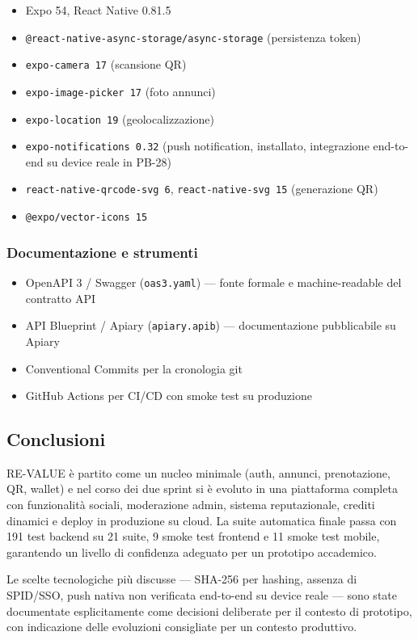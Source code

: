 \documentclass[11pt,a4paper]{article}
\newcommand{\code}[1]{\texttt{#1}}
\begin{document}
\begin{itemize}[noitemsep]
  \item Expo 54, React Native 0.81.5
  \item \code{@react-native-async-storage/async-storage} (persistenza token)
  \item \code{expo-camera 17} (scansione QR)
  \item \code{expo-image-picker 17} (foto annunci)
  \item \code{expo-location 19} (geolocalizzazione)
  \item \code{expo-notifications 0.32} (push notification, installato, integrazione end-to-end su device reale in PB-28)
  \item \code{react-native-qrcode-svg 6}, \code{react-native-svg 15} (generazione QR)
  \item \code{@expo/vector-icons 15}
\end{itemize}

\subsubsection*{Documentazione e strumenti}

\begin{itemize}[noitemsep]
  \item OpenAPI 3 / Swagger (\code{oas3.yaml}) --- fonte formale e machine-readable del contratto API
  \item API Blueprint / Apiary (\code{apiary.apib}) --- documentazione pubblicabile su Apiary
  \item Conventional Commits per la cronologia git
  \item GitHub Actions per CI/CD con smoke test su produzione
\end{itemize}


\subsection{Conclusioni}

RE-VALUE è partito come un nucleo minimale (auth, annunci, prenotazione, QR, wallet) e nel corso dei due sprint si è evoluto in una piattaforma completa con funzionalità sociali, moderazione admin, sistema reputazionale, crediti dinamici e deploy in produzione su cloud. La suite automatica finale passa con 191 test backend su 21 suite, 9 smoke test frontend e 11 smoke test mobile, garantendo un livello di confidenza adeguato per un prototipo accademico.

Le scelte tecnologiche più discusse --- SHA-256 per hashing, assenza di SPID/SSO, push nativa non verificata end-to-end su device reale --- sono state documentate esplicitamente come decisioni deliberate per il contesto di prototipo, con indicazione delle evoluzioni consigliate per un contesto produttivo.
\end{document}
